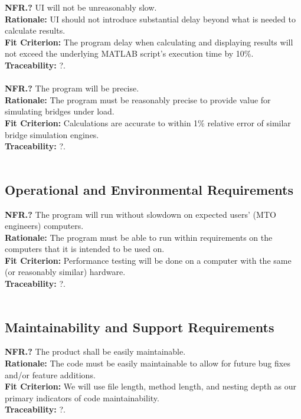 \documentclass[12pt]{article}
\begin{document}
  \noindent\textbf{NFR.?} UI will not be unreasonably slow.\\
  \textbf{Rationale:} UI should not introduce substantial delay beyond what is needed to calculate results.\\
  \textbf{Fit Criterion:} The program delay when calculating and displaying results will not exceed the underlying MATLAB script's execution time by 10\%.\\
  \textbf{Traceability:} ?.\\\\

  \noindent\textbf{NFR.?} The program will be precise.\\
  \textbf{Rationale:} The program must be reasonably precise to provide value for simulating bridges under load.\\
  \textbf{Fit Criterion:} Calculations are accurate to within 1\% relative error of similar bridge simulation engines.\\
  \textbf{Traceability:} ?.\\\\

\subsection{Operational and Environmental Requirements}

  \textbf{NFR.?} The program will run without slowdown on expected users' (MTO engineers) computers.\\
  \textbf{Rationale:} The program must be able to run within requirements on the computers that it is intended to be used on.\\
  \textbf{Fit Criterion:} Performance testing will be done on a computer with the same (or reasonably similar) hardware.\\
  \textbf{Traceability:} ?.\\\\

\subsection{Maintainability and Support Requirements}

  \textbf{NFR.?} The product shall be easily maintainable.\\
  \textbf{Rationale:} The code must be easily maintainable to allow for future bug fixes and/or feature additions.\\
  \textbf{Fit Criterion:} We will use file length, method length, and nesting depth as our primary indicators of code maintainability.\\
  \textbf{Traceability:} ?.\\\\
\end{document}
